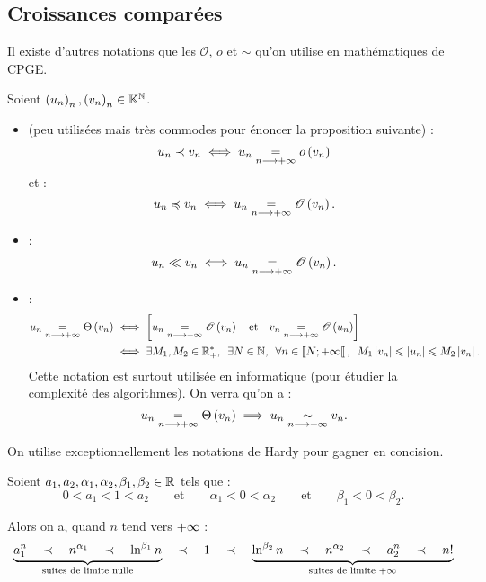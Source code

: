 \subsection{Croissances comparées}

\begin{rem}[Culturelle]
Il existe d'autres notations que les  \(\mathscr{O}\), \(o\) et \(\sim\) qu'on utilise en mathématiques de CPGE.

Soient \(\left(u_n\right)_n,\left(v_n\right)_n\in\mathbb{K}^{\mathbb{N}}\).

\begin{itemize}
    \item {} (peu utilisées mais très commodes pour énoncer la proposition suivante) : \[u_n\prec v_n\iff u_n\underset{n\longrightarrow+\infty}{=}o\left(v_n\right)\] et : \[u_n\preccurlyeq v_n\iff u_n\underset{n\longrightarrow+\infty}{=}\mathscr{O}\left(v_n\right).\]
    \item {} : \[u_n\ll v_n\iff u_n\underset{n\longrightarrow+\infty}{=}\mathscr{O}\left(v_n\right).\]
    \item {} : \[\begin{aligned}
        u_n\egqd{n\to\pinf}\Theta\paren{v_n}&\ssi\croch{u_n\egqd{n\to\pinf}\O{v_n}\quad\text{et}\quad v_n\egqd{n\to\pinf}\O{u_n}} \\
        &\ssi\quantifs{\exists M_1,M_2\in\Rps;\exists N\in\N;\forall n\in\interventierie{N}{\pinf}}M_1\abs{v_n}\leq\abs{u_n}\leq M_2\abs{v_n}.
    \end{aligned}\] Cette notation est surtout utilisée en informatique (pour étudier la complexité des algorithmes). On verra qu'on a : \[u_n\underset{n\longrightarrow+\infty}{=}\Theta\left(v_n\right)\implies u_n\underset{n\longrightarrow+\infty}{\sim}v_n.\]
\end{itemize}
\end{rem}

\begin{prop}
On utilise exceptionnellement les notations de Hardy pour gagner en concision.

Soient \(a_1,a_2,\alpha_1,\alpha_2,\beta_1,\beta_2\in\mathbb{R}\) tels que : \[0<a_1<1<a_2\qquad\text{et}\qquad\alpha_1<0<\alpha_2\qquad\text{et}\qquad\beta_1<0<\beta_2.\]

Alors on a, quand \(n\) tend vers \(+\infty\) : \[\underbrace{a_1^n\quad\prec\quad n^{\alpha_1}\quad\prec\quad\ln^{\beta_1}n}_{\text{suites de limite nulle}}\quad\prec\quad1\quad\prec\quad\underbrace{\ln^{\beta_2}n\quad\prec\quad n^{\alpha_2}\quad\prec\quad a_2^n\quad\prec\quad n!}_{\text{suites de limite }+\infty}\]
\end{prop}

